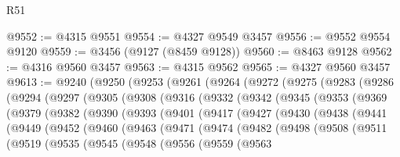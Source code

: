 \begin{lexlean}{R51}
\begin{coremodule}
@9552 := @4315 @9551
@9554 := @4327 @9549 @3457
@9556 := @9552 @9554 @9120
@9559 := @3456 (@9127 (@8459 @9128))
@9560 := @8463 @9128
@9562 := @4316 @9560 @3457
@9563 := @4315 @9562
@9565 := @4327 @9560 @3457
@9613 := @9240
    (@9250
      (@9253
        (@9261
          (@9264
            (@9272
              (@9275
                (@9283
                  (@9286
                    (@9294
                      (@9297
                        (@9305
                          (@9308
                            (@9316
                              (@9332
                                (@9342
                                  (@9345
                                    (@9353
                                      (@9369
                                        (@9379
                                          (@9382
                                            (@9390
                                              (@9393
                                                (@9401
                                                  (@9417
                                                    (@9427
                                                      (@9430
                                                        (@9438
                                                          (@9441
                                                            (@9449
                                                              (@9452
                                                                (@9460
                                                                  (@9463
                                                                    (@9471
                                                                      (@9474
                                                                        (@9482
                                                                          (@9498
                                                                            (@9508
                                                                              (@9511
                                                                                (@9519
                                                                                  (@9535
                                                                                    (@9545
                                                                                      (@9548
                                                                                        (@9556
                                                                                          (@9559
                                                                                            (@9563

\end{coremodule}
\end{lexlean}
